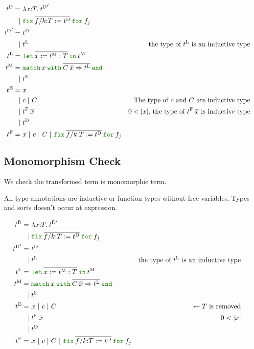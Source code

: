 \documentclass[a4paper,fleqn]{article}
\newcommand{\kwlet}{\mbox{\color{mygreen}\ttfamily let}}
\newcommand{\kwin}{\mbox{\color{mygreen}\ttfamily in}}
\newcommand{\kwmatch}{\mbox{\color{mygreen}\ttfamily match}}
\newcommand{\kwwith}{\mbox{\color{mygreen}\ttfamily with}}
\newcommand{\kwend}{\mbox{\color{mygreen}\ttfamily end}}
\newcommand{\kwfix}{\mbox{\color{mygreen}\ttfamily fix}}
\newcommand{\kwfor}{\mbox{\color{mygreen}\ttfamily for}}
\newcommand{\lamT}[3]{\lambda #1\mathord{:}#2.\:#3}
\newcommand{\letinM}[3]{\kwlet\:\rep{#1:=#2}\:\kwin\:#3}
\newcommand{\omatch}[2]{\kwmatch\:#1\:\kwwith\:{#2}\:\kwend}
\newcommand{\ofix}[2]{\kwfix\:{#1}\:\kwfor\:{#2}}
\newcommand{\tD}{{t^\mathrm{D}}}
\newcommand{\tE}{{t^\mathrm{E}}}
\newcommand{\tL}{{t^\mathrm{L}}}
\newcommand{\tM}{{t^\mathrm{M}}}
\newcommand{\tF}{{t^\mathrm{F}}}
\newcommand{\rep}[1]{\overline{#1}}
\begin{document}
\begin{align*}
  \tD =&\ \lamT{x}{T}{\tD'} \\
      |&\ \ofix{\overline{f/k{:}T:=\tD}}{f_j} \\
  \tD' =&\ \tD \\
       |&\ \tL & \text{the type of $\tL$ is an inductive type} \\
  \tL =&\ \letinM{x}{\tM:T}{\tM} \\
  \tM =&\ \omatch{x}{\overline{C\:\overline{x}\Rightarrow \tL}} \\
      |&\ \tE \\
  \tE =&\ x \\
    |&\ c ~|~ C & \text{The type of $c$ and $C$ are inductive type} \\
    |&\ \tF\:\rep{x} & \text{$0 < |x|$, the type of $\tF\:\rep{x}$ is inductive type}  \\
    |&\ \tD \\
  \tF =&\ x ~|~ c ~|~ C ~|~ \ofix{\overline{f/k{:}T:=\tD}}{f_j}
\end{align*}

\subsection{Monomorphism Check}\label{sec:check-monomorphism}

We check the transformed term is monomorphic term.

All type annotations are inductive or function types without free variables.
Types and sorts doesn't occur at expression.

\begin{align*}
  \tD =&\ \lamT{x}{T}{\tD'} \\
      |&\ \ofix{\overline{f/k{:}T:=\tD}}{f_j} \\
  \tD' =&\ \tD \\
       |&\ \tL & \text{the type of $\tL$ is an inductive type} \\
  \tL =&\ \letinM{x}{\tM:T}{\tM} \\
  \tM =&\ \omatch{x}{\overline{C\:\overline{x}\Rightarrow \tL}} \\
      |&\ \tE \\
  \tE =&\ x ~|~ c ~|~ C & \leftarrow \text{$T$ is removed} \\
    |&\ \tF\:\rep{x} & \text{$0 < |x|$} \\
    |&\ \tD \\
  \tF =&\ x ~|~ c ~|~ C ~|~ \ofix{\overline{f/k{:}T:=\tD}}{f_j}
\end{align*}
\end{document}
